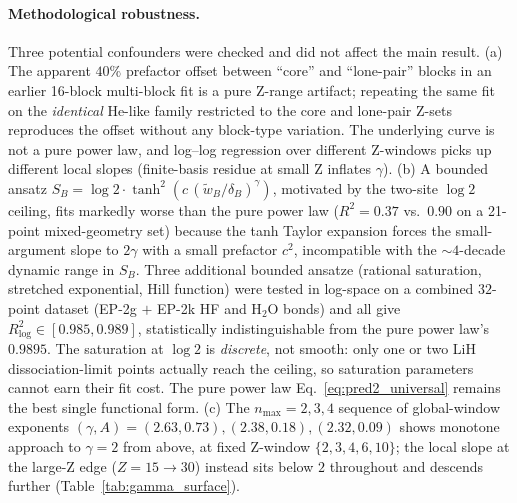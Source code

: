 \documentclass[twocolumn,pra,amsmath,amssymb,superscriptaddress]{revtex4-2}
\begin{document}
\paragraph*{Methodological robustness.}  Three potential
confounders were checked and did not affect the main result.
(a) The apparent $40\%$ prefactor offset between ``core'' and
``lone-pair'' blocks in an earlier 16-block multi-block fit is a
pure Z-range artifact; repeating the same fit on the
\emph{identical} He-like family restricted to the core and
lone-pair Z-sets reproduces the offset without any block-type
variation.  The underlying curve is not a pure power law, and
log--log regression over different Z-windows picks up different
local slopes (finite-basis residue at small Z inflates
$\gamma$).  (b) A bounded ansatz
$S_B = \log 2 \cdot \tanh^{2}(c\,(\tilde{w}_B/\delta_B)^{\gamma})$,
motivated by the two-site $\log 2$ ceiling, fits markedly worse
than the pure power law ($R^{2}=0.37$ vs.\ $0.90$ on a
21-point mixed-geometry set) because the tanh Taylor expansion
forces the small-argument slope to $2\gamma$ with a small
prefactor $c^{2}$, incompatible with the $\sim 4$-decade
dynamic range in $S_B$.  Three additional bounded ansatze
(rational saturation, stretched exponential, Hill function)
were tested in log-space on a combined $32$-point dataset
(EP-2g $+$ EP-2k HF and H$_2$O bonds) and all give
$R^{2}_{\mathrm{log}} \in [0.985, 0.989]$, statistically
indistinguishable from the pure power law's $0.9895$.  The
saturation at $\log 2$ is \emph{discrete}, not smooth: only
one or two LiH dissociation-limit points actually reach the
ceiling, so saturation parameters cannot earn their fit cost.
The pure power law Eq.~\eqref{eq:pred2_universal} remains the
best single functional form.  (c) The $n_{\max}=2,3,4$ sequence of
global-window exponents $(\gamma, A) = (2.63, 0.73),
(2.38, 0.18), (2.32, 0.09)$ shows monotone approach to $\gamma=2$
from above, at fixed Z-window $\{2,3,4,6,10\}$; the local slope
at the large-Z edge ($Z=15\to 30$) instead sits below $2$ throughout
and descends further (Table~\ref{tab:gamma_surface}).
\end{document}

